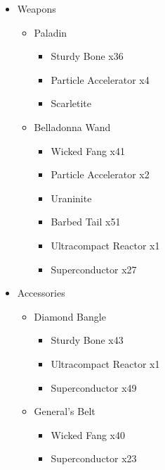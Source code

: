 \begin{upgrade}
	\begin{itemize}
		\item Weapons
			\begin{itemize}
				\item Paladin
					\begin{itemize}
						\item Sturdy Bone x36
						\item Particle Accelerator x4
						\item Scarletite
					\end{itemize}
				\item Belladonna Wand
					\begin{itemize}
						\item Wicked Fang x41
						\item Particle Accelerator x2
						\item Uraninite
						\item Barbed Tail x51
						\item Ultracompact Reactor x1
						\item Superconductor x27						
					\end{itemize}
			\end{itemize}
		\item Accessories
			\begin{itemize}
				\item Diamond Bangle
					\begin{itemize}
						\item Sturdy Bone x43
						\item Ultracompact Reactor x1
						\item Superconductor x49
					\end{itemize}
				\item General's Belt
					\begin{itemize}
						\item Wicked Fang x40
						\item Superconductor x23
					\end{itemize}							
			\end{itemize}
	\end{itemize}
\end{upgrade}

